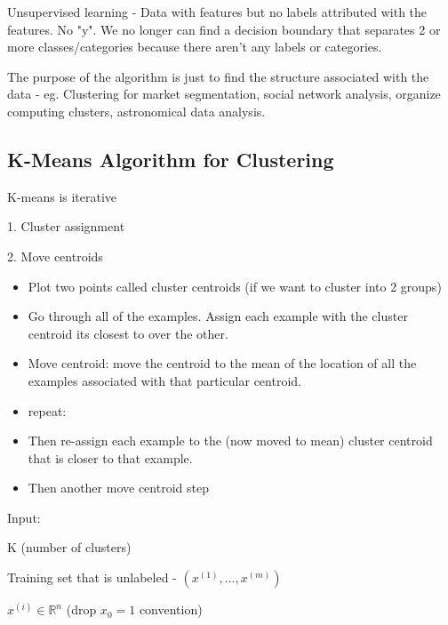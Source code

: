 \documentclass{article}
\begin{document}
Unsupervised learning - Data with features but no labels attributed with the features. No "y". We no longer can find a decision boundary that separates 2 or more classes/categories because there aren't any labels or categories.

The purpose of the algorithm is just to find the structure associated with the data - eg. Clustering for market segmentation, social network analysis, organize computing clusters, astronomical data analysis.


\subsection{K-Means Algorithm for Clustering}

K-means is iterative

1. Cluster assignment

2. Move centroids

\begin{itemize}
    \item Plot two points called cluster centroids (if we want to cluster into 2 groups)
    \item Go through all of the examples. Assign each example with the cluster centroid its closest to over the other.
    \item Move centroid: move the centroid to the mean of the location of all the examples associated with that particular centroid.
    \item repeat:
    \item Then re-assign each example to the (now moved to mean) cluster centroid that is closer to that example.
    \item Then another move centroid step
\end{itemize}



Input:

K (number of clusters)

Training set that is unlabeled - $(x^{(1)}, ..., x^{(m)})$


$x^{(i)} \in \mathbb{R}^{n}$ (drop $x_0 = 1$ convention)
\end{document}

